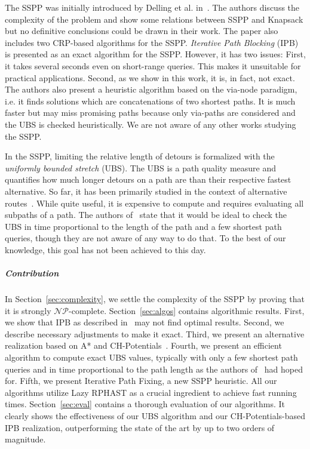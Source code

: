 \documentclass[a4paper,UKenglish,cleveref, autoref, thm-restate]{lipics-v2021}
\begin{document}
The SSPP was initially introduced by Delling et al. in~\cite{dss-tarrn-18}.
The authors discuss the complexity of the problem and show some relations between SSPP and Knapsack but no definitive conclusions could be drawn in their work.
The paper also includes two CRP-based algorithms for the SSPP.
\emph{Iterative Path Blocking} (IPB) is presented as an exact algorithm for the SSPP.
However, it has two issues:
First, it takes several seconds even on short-range queries.
This makes it unsuitable for practical applications.
Second, as we show in this work, it is, in fact, not exact.
The authors also present a heuristic algorithm based on the via-node paradigm, i.e. it finds solutions which are concatenations of two shortest paths.
It is much faster but may miss promising paths because only via-paths are considered and the UBS is checked heuristically.
We are not aware of any other works studying the SSPP.

In the SSPP, limiting the relative length of detours is formalized with the \emph{uniformly bounded stretch} (UBS).
The UBS is a path quality measure and quantifies how much longer detours on a path are than their respective fastest alternative.
So far, it has been primarily studied in the context of alternative routes~\cite{adgw-arrn-13}.
While quite useful, it is expensive to compute and requires evaluating all subpaths of a path.
The authors of~\cite{adgw-arrn-13} state that it would be ideal to check the UBS in time proportional to the length of the path and a few shortest path queries, though they are not aware of any way to do that.
To the best of our knowledge, this goal has not been achieved to this day.

\subparagraph{Contribution}

In Section~\ref{sec:complexity}, we settle the complexity of the SSPP by proving that it is strongly $\mathcal{NP}$-complete.
Section~\ref{sec:algos} contains algorithmic results.
First, we show that IPB as described in~\cite{dss-tarrn-18} may not find optimal results.
Second, we describe necessary adjustments to make it exact.
Third, we present an alternative realization based on A* and CH-Potentials~\cite{strasser_et_al:LIPIcs.SEA.2021.6}.
Fourth, we present an efficient algorithm to compute exact UBS values, typically with only a few shortest path queries and in time proportional to the path length as the authors of~\cite{adgw-arrn-13} had hoped for.
Fifth, we present Iterative Path Fixing, a new SSPP heuristic.
All our algorithms utilize Lazy RPHAST as a crucial ingredient to achieve fast running times.
Section~\ref{sec:eval} contains a thorough evaluation of our algorithms.
It clearly shows the effectiveness of our UBS algorithm and our CH-Potentials-based IPB realization, outperforming the state of the art by up to two orders of magnitude.
\end{document}
